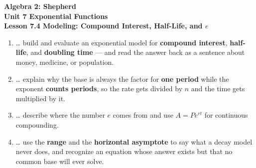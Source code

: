 \documentclass[10pt]{article}
\begin{document}
\vspace{-0.8in}

\begin{center}
  {\color{white}\textbf{\LARGE Algebra 2: Shepherd}}\\[4pt]
  {\color{forestmid}\large\textbf{Unit 7 \quad Exponential Functions}}\\[6pt]
  {\color{white}\textbf{\large Lesson 7.4 \quad Modeling: Compound Interest, Half-Life, and $e$}}
\end{center}

\vspace{0.22in}
\namedateperiod
\vspace{0.18in}

\begin{learningtargetbox}
\small
\begin{enumerate}[leftmargin=1.5em, itemsep=5pt]
  \item \ldots{} build and evaluate an exponential model for \textbf{compound interest}, \textbf{half-life}, and \textbf{doubling time} --- and read the answer back as a sentence about money, medicine, or population.
  \item \ldots{} explain why the base is always the factor for \textbf{one period} while the exponent \textbf{counts periods}, so the rate gets divided by $n$ and the time gets multiplied by it.
  \item \ldots{} describe where the number $e$ comes from and use $A=Pe^{rt}$ for continuous compounding.
  \item \ldots{} use the \textbf{range} and the \textbf{horizontal asymptote} to say what a decay model never does, and recognize an equation whose answer exists but that no common base will ever solve.
\end{enumerate}
\end{learningtargetbox}

\vspace{0.14in}
\end{document}
